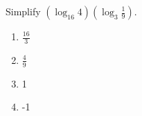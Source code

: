 \bigskip

\item Simplify $\displaystyle (\log_{16}4)\left( \log_3 \frac{1}{9}\right)$.

\begin{enumerate}
\item $\displaystyle \frac{16}{3}$
\item $\displaystyle \frac{4}{9}$
\item 1
\item -1
\end{enumerate}

